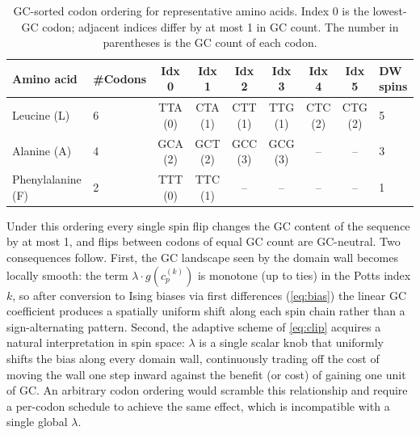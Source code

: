 \documentclass[11pt]{article}
\begin{document}
\begin{table}[H]
\centering
\caption{GC-sorted codon ordering for representative amino acids. Index 0 is the lowest-GC codon; adjacent indices differ by at most 1 in GC count. The number in parentheses is the GC count of each codon.}
\label{tab:codon-ordering}
\vspace{2mm}
\begin{tabular}{llccccccl}
\toprule
Amino acid & \#Codons & Idx 0 & Idx 1 & Idx 2 & Idx 3 & Idx 4 & Idx 5 & DW spins \\
\midrule
Leucine (L) & 6 & TTA (0) & CTA (1) & CTT (1) & TTG (1) & CTC (2) & CTG (2) & 5 \\
Alanine (A) & 4 & GCA (2) & GCT (2) & GCC (3) & GCG (3) & -- & -- & 3 \\
Phenylalanine (F) & 2 & TTT (0) & TTC (1) & -- & -- & -- & -- & 1 \\
\bottomrule
\end{tabular}
\end{table}

\noindent
Under this ordering every single spin flip changes the GC content of the sequence by at most 1, and flips between codons of equal GC count are GC-neutral.
Two consequences follow.
First, the GC landscape seen by the domain wall becomes locally smooth: the term $\lambda \cdot g(c_p^{(k)})$ is monotone (up to ties) in the Potts index $k$, so after conversion to Ising biases via first differences (\cref{eq:bias}) the linear GC coefficient produces a spatially uniform shift along each spin chain rather than a sign-alternating pattern.
Second, the adaptive scheme of \cref{eq:clip} acquires a natural interpretation in spin space: $\lambda$ is a single scalar knob that uniformly shifts the bias along every domain wall, continuously trading off the cost of moving the wall one step inward against the benefit (or cost) of gaining one unit of GC.
An arbitrary codon ordering would scramble this relationship and require a per-codon schedule to achieve the same effect, which is incompatible with a single global $\lambda$.


\end{document}

